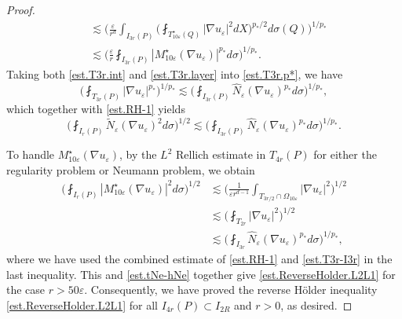 \documentclass[reqno,12pt]{amsart} %
\theoremstyle{definition}
\theoremstyle{remark}
\numberwithin{equation}{section}
\newcommand{\e}{\varepsilon}
\begin{document}
\begin{proof}
\begin{equation}
\begin{aligned}
    & \lesssim \bigg( \frac{\e}{r^d} \int_{I_{3r}(P)} \bigg( \fint_{T_{10\e}^\star(Q)} |\nabla u_\e|^{2} dX \bigg)^{p_*/2} d\sigma(Q) \bigg)^{1/p_*} \\
    & \lesssim \bigg( \frac{\e}{r} \fint_{I_{3r}(P)} |M_{10\e}^\star(\nabla u_\e)|^{p_*} d\sigma \bigg)^{1/p_*}.
    \end{aligned}
\end{equation}
Taking both \eqref{est.T3r.int} and \eqref{est.T3r.layer} into \eqref{est.T3r.p*}, we have
\begin{equation}\label{est.T3r-I3r}
    \bigg( \fint_{T_{3r}(P)} |\nabla u_\e|^{p_*} \bigg)^{1/p_*} \lesssim \bigg( \fint_{I_{3r}(P)} \widehat{N}_\e(\nabla u_\e)^{p_*} d\sigma \bigg)^{1/p_*},
\end{equation}
which together with \eqref{est.RH-1} yields
\begin{equation}\label{est.tNe-hNe}
    \bigg( \fint_{I_r(P)} \widetilde{N}_\e(\nabla u_\e)^2 d\sigma \bigg)^{1/2} \lesssim \bigg( \fint_{I_{3r}(P)} \widehat{N}_\e(\nabla u_\e)^{p_*} d\sigma \bigg)^{1/p_*}.
\end{equation}

To handle $M_{10\e}^\star(\nabla u_\e)$, by the $L^2$ Rellich estimate in $T_{4r}(P)$ for either the regularity problem or Neumann problem, we obtain
\begin{equation}
\begin{aligned}
    \bigg( \fint_{I_r(P)} | M_{10\e}^\star(\nabla u_\e)|^2 d\sigma \bigg)^{1/2} & \lesssim 
    \bigg( \frac{1}{\e r^{d-1}} \int_{T_{3r/2} \cap \Omega_{10\e} } |\nabla u_\e|^2 \bigg)^{1/2} \\
    & \lesssim \bigg( \fint_{T_{2r}} |\nabla u_\e|^2 \bigg)^{1/2} \\
    & \lesssim \bigg( \fint_{I_{3r}} \widehat{N}_\e(\nabla u_\e)^{p_*} d\sigma \bigg)^{1/p_*},
    \end{aligned}
\end{equation}
where we have used the combined estimate of \eqref{est.RH-1} and \eqref{est.T3r-I3r} in the last inequality.
This and \eqref{est.tNe-hNe} together give \eqref{est.ReverseHolder.L2L1} for the case $r>50\e$.
Consequently, we have proved the reverse H\"{o}lder inequality \eqref{est.ReverseHolder.L2L1} for all $I_{4r}(P) \subset I_{2R}$ and $r>0$, as desired.
\end{proof}
\end{document}
